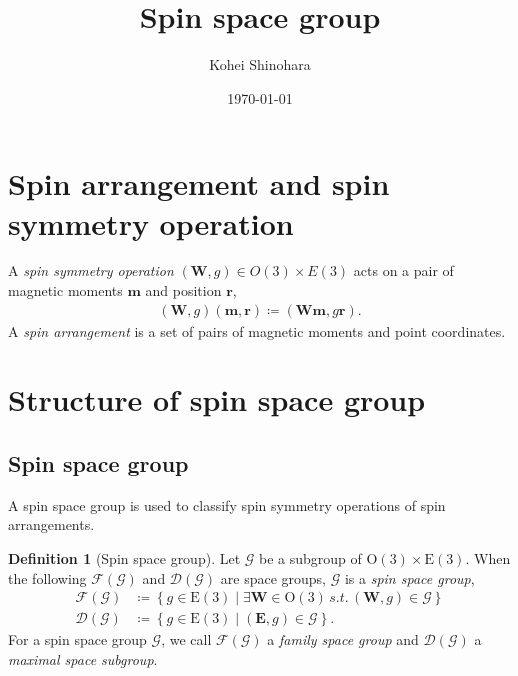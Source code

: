 \documentclass[a4paper, 11pt]{article}
\title{Spin space group}
\author{Kohei Shinohara}
\date{\today}
\theoremstyle{definition}
\newcommand{\term}[1]{\textit{#1}}
\newcommand{\relmiddle}[1]{\mathrel{}\middle#1\mathrel{}}
\newcommand{\set}[2]{\left\{ #1 \relmiddle| #2 \right\}}
\newtheorem{definition}[theorem]{Definition}
\begin{document}
\maketitle
\tableofcontents

\section{Spin arrangement and spin symmetry operation}

A \term{spin symmetry operation} $(\bm{W}, g) \in O(3) \times E(3)$ acts on a pair of magnetic moments $\bm{m}$ and position $\bm{r}$,
\begin{align}
  (\bm{W}, g) (\bm{m}, \bm{r}) \coloneqq (\bm{Wm}, g \bm{r}).
\end{align}
A \term{spin arrangement} is a set of pairs of magnetic moments and point coordinates.

\section{Structure of spin space group}

\subsection{Spin space group}

A spin space group \cite{doi:10.1063/1.1708514,doi:10.1098/rspa.1966.0211,LITVIN1974538,Opechowski1986} is used to classify spin symmetry operations of spin arrangements.

\begin{screen}
  \begin{definition}[Spin space group]
    Let $\mathcal{G}$ be a subgroup of $\mathrm{O}(3) \times \mathrm{E}(3)$.
    When the following $\mathcal{F}(\mathcal{G})$ and $\mathcal{D}(\mathcal{G})$ are space groups, $\mathcal{G}$ is a \term{spin space group},
    \begin{align}
      \mathcal{F}(\mathcal{G})
        &\coloneqq \set{ g \in \mathrm{E}(3) }{ \exists \bm{W} \in \mathrm{O}(3) \,s.t.\, (\bm{W}, g) \in \mathcal{G} } \\
      \mathcal{D}(\mathcal{G})
        &\coloneqq \set{ g \in \mathrm{E}(3) }{ (\bm{E}, g) \in \mathcal{G} }.
    \end{align}
    For a spin space group $\mathcal{G}$, we call $\mathcal{F}(\mathcal{G})$ a \term{family space group} and $\mathcal{D}(\mathcal{G})$ a \term{maximal space subgroup}.
  \end{definition}
\end{screen}
\end{document}
